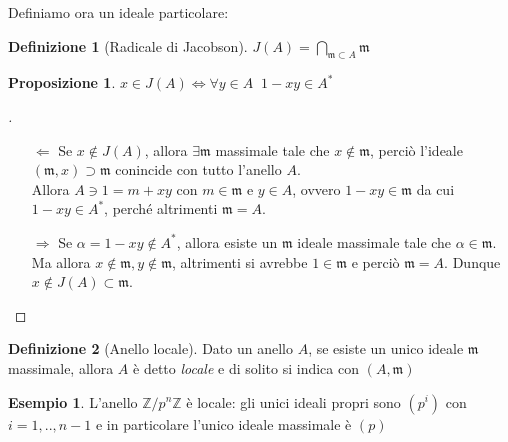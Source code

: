 \documentclass[a4paper,10pt]{article}
\theoremstyle{plain}
\newtheorem{prop}[thm]{Proposizione}
\theoremstyle{definition}
\newtheorem{defn}{Definizione}[section]
\newtheorem*{exmp}{Esempio}
\newenvironment{myproof}[1][\proofname]{%
  \begin{proof}[#1]$ $\par\nobreak\ignorespaces
}{%
  \qedhere
  \end{proof}
}
\newcommand{\m}{\mathfrak{m}}
\newcommand{\Z}{\mathbb{Z}}
\newcommand{\Zn}[1]{\Z/#1\Z}
\begin{document}
Definiamo ora un ideale particolare:
\begin{defn}[Radicale di Jacobson]
    $\displaystyle J(A)=\bigcap_{\mathfrak{m}\subset A}\m$
\end{defn}

\begin{prop}
    $\displaystyle x\in J(A) \iff \forall y\in A\;\; 1-xy\in A^\ast$
\end{prop}
\begin{myproof}
    \begin{itemize}
        \item[$\Longleftarrow$] Se $x\not\in J(A)$, allora $\exists\mathfrak{m}$ massimale tale che $x\not\in\mathfrak{m}$, perciò l'ideale $(\mathfrak{m},x)\supset\mathfrak{m}$ conincide con tutto l'anello $A$.\\
        Allora $A\ni 1=m+xy$ con $m\in\mathfrak{m}$ e $y\in A$, ovvero $1-xy\in\mathfrak{m}$ da cui $1-xy\in A^\ast$, perché altrimenti $\mathfrak{m}=A$.
        \item[$\Longrightarrow$] Se $\alpha=1-xy\not\in A^\ast$, allora esiste un $\m$ ideale massimale tale che $\alpha\in\m$.\\
        Ma allora $x\not\in\m,y\not\in\m$, altrimenti si avrebbe $1\in\m$ e perciò $\m=A$. Dunque $x\not\in J(A)\subset\m$.
    \end{itemize}
\end{myproof}

\begin{defn}[Anello locale]
    Dato un anello $A$, se esiste un unico ideale $\m$ massimale, allora $A$ è detto \textit{locale} e di solito si indica con $(A,\m)$
\end{defn}
\begin{exmp}
    L'anello $\Zn{p^n}$ è locale: gli unici ideali propri sono $(p^i)$ con $i=1,..,n-1$ e in particolare l'unico ideale massimale è $(p)$
\end{exmp}
\end{document}
